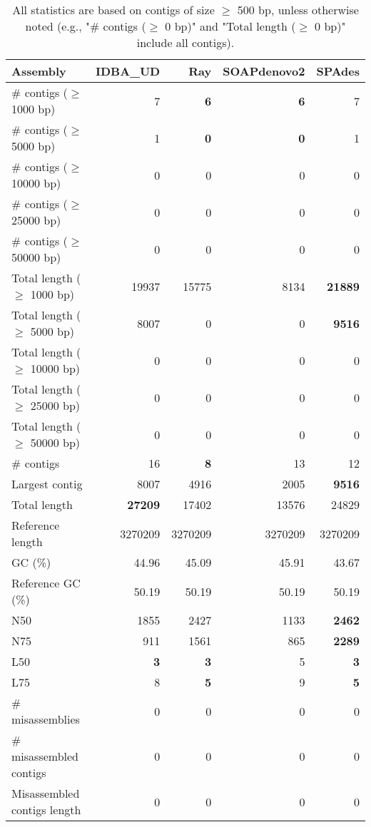 \documentclass[12pt,a4paper]{article}
\begin{document}
\begin{table}[ht]
\begin{center}
\caption{All statistics are based on contigs of size $\geq$ 500 bp, unless otherwise noted (e.g., "\# contigs ($\geq$ 0 bp)" and "Total length ($\geq$ 0 bp)" include all contigs).}
\begin{tabular}{|l*{4}{|r}|}
\hline
Assembly & IDBA\_UD & Ray & SOAPdenovo2 & SPAdes \\ \hline
\# contigs ($\geq$ 1000 bp) & 7 & {\bf 6} & {\bf 6} & 7 \\ \hline
\# contigs ($\geq$ 5000 bp) & 1 & {\bf 0} & {\bf 0} & 1 \\ \hline
\# contigs ($\geq$ 10000 bp) & 0 & 0 & 0 & 0 \\ \hline
\# contigs ($\geq$ 25000 bp) & 0 & 0 & 0 & 0 \\ \hline
\# contigs ($\geq$ 50000 bp) & 0 & 0 & 0 & 0 \\ \hline
Total length ($\geq$ 1000 bp) & 19937 & 15775 & 8134 & {\bf 21889} \\ \hline
Total length ($\geq$ 5000 bp) & 8007 & 0 & 0 & {\bf 9516} \\ \hline
Total length ($\geq$ 10000 bp) & 0 & 0 & 0 & 0 \\ \hline
Total length ($\geq$ 25000 bp) & 0 & 0 & 0 & 0 \\ \hline
Total length ($\geq$ 50000 bp) & 0 & 0 & 0 & 0 \\ \hline
\# contigs & 16 & {\bf 8} & 13 & 12 \\ \hline
Largest contig & 8007 & 4916 & 2005 & {\bf 9516} \\ \hline
Total length & {\bf 27209} & 17402 & 13576 & 24829 \\ \hline
Reference length & 3270209 & 3270209 & 3270209 & 3270209 \\ \hline
GC (\%) & 44.96 & 45.09 & 45.91 & 43.67 \\ \hline
Reference GC (\%) & 50.19 & 50.19 & 50.19 & 50.19 \\ \hline
N50 & 1855 & 2427 & 1133 & {\bf 2462} \\ \hline
N75 & 911 & 1561 & 865 & {\bf 2289} \\ \hline
L50 & {\bf 3} & {\bf 3} & 5 & {\bf 3} \\ \hline
L75 & 8 & {\bf 5} & 9 & {\bf 5} \\ \hline
\# misassemblies & 0 & 0 & 0 & 0 \\ \hline
\# misassembled contigs & 0 & 0 & 0 & 0 \\ \hline
Misassembled contigs length & 0 & 0 & 0 & 0 \\ \hline

\end{tabular}
\end{center}
\end{table}
\end{document}
